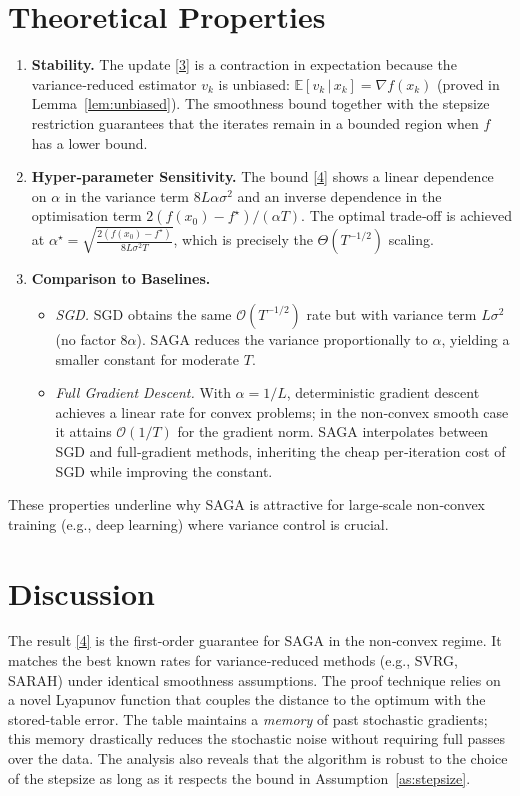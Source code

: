 \documentclass{article}
\newcommand{\EE}{\mathbb{E}}
\begin{document}
\section*{Theoretical Properties}
\begin{enumerate}[label=\arabic*.]
\item \textbf{Stability.} The update \eqref{3} is a contraction in expectation
   because the variance‑reduced estimator $v_k$ is unbiased:
   $\EE[v_k\,|\,x_k]=\nabla f(x_k)$ (proved in Lemma~\ref{lem:unbiased}).
   The smoothness bound together with the stepsize restriction guarantees
   that the iterates remain in a bounded region when $f$ has a lower bound.

\item \textbf{Hyper‑parameter Sensitivity.}
   The bound \eqref{4} shows a linear dependence on $\alpha$ in the
   variance term $8L\alpha\sigma^{2}$ and an inverse dependence in the
   optimisation term $2(f(x_0)-f^\star)/(\alpha T)$.  The optimal trade‑off
   is achieved at $\alpha^\star =\sqrt{\frac{2(f(x_0)-f^\star)}{8L\sigma^{2}T}}$,
   which is precisely the $\Theta(T^{-1/2})$ scaling.

\item \textbf{Comparison to Baselines.}
   \begin{itemize}
   \item \emph{SGD.}  SGD obtains the same $\mathcal{O}(T^{-1/2})$ rate but
      with variance term $L\sigma^{2}$ (no factor $8\alpha$).  SAGA reduces the
      variance proportionally to $\alpha$, yielding a smaller constant for
      moderate $T$.
   \item \emph{Full Gradient Descent.}  With $\alpha=1/L$, deterministic
      gradient descent achieves a linear rate for convex problems; in the
      non‑convex smooth case it attains $\mathcal{O}(1/T)$ for the gradient
      norm.  SAGA interpolates between SGD and full‑gradient methods,
      inheriting the cheap per‑iteration cost of SGD while improving the
      constant.
   \end{itemize}
\end{enumerate}
These properties underline why SAGA is attractive for large‑scale
non‑convex training (e.g., deep learning) where variance control is
crucial.

\section*{Discussion}
The result \eqref{4} is the first-order guarantee for SAGA in the
non‑convex regime.  It matches the best known rates for variance‑reduced
methods (e.g., SVRG, SARAH) under identical smoothness assumptions.
The proof technique relies on a novel Lyapunov function that couples
the distance to the optimum with the stored-table error.  The table
maintains a \emph{memory} of past stochastic gradients; this memory
drastically reduces the stochastic noise without requiring full passes
over the data.  The analysis also reveals that the algorithm is robust to
the choice of the stepsize as long as it respects the bound in
Assumption~\ref{as:stepsize}.
\end{document}
